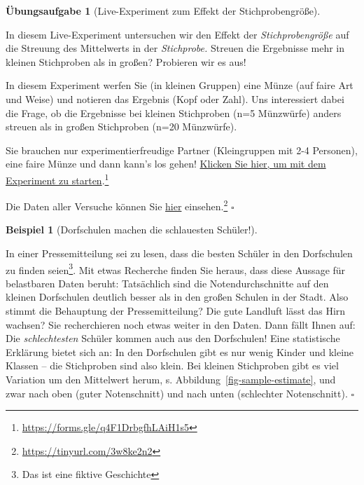 \documentclass[
  a4paper,
  DIV=11]{scrreprt}
\theoremstyle{definition}
\newtheorem{exercise}{Übungsaufgabe}[chapter]
\theoremstyle{definition}
\newtheorem{example}{Beispiel}[chapter]
\theoremstyle{definition}
\theoremstyle{remark}
\begin{document}
\begin{exercise}[Live-Experiment zum Effekt der
Stichprobengröße]\protect\hypertarget{exr-kleine-grosse-stipro}{}\label{exr-kleine-grosse-stipro}

In diesem Live-Experiment untersuchen wir den Effekt der
\emph{Stichprobengröße} auf die Streuung des Mittelwerts in der
\emph{Stichprobe.} Streuen die Ergebnisse mehr in kleinen Stichproben
als in großen? Probieren wir es aus!

In diesem Experiment werfen Sie (in kleinen Gruppen) eine Münze (auf
faire Art und Weise) und notieren das Ergebnis (Kopf oder Zahl). Uns
interessiert dabei die Frage, ob die Ergebnisse bei kleinen Stichproben
(n=5 Münzwürfe) anders streuen als in großen Stichproben (n=20
Münzwürfe).

Sie brauchen nur experimentierfreudige Partner (Kleingruppen mit 2-4
Personen), eine faire Münze und dann kann's los gehen!
\href{https://docs.google.com/forms/d/e/1FAIpQLSeAwqNyZtyQwttq5JrQdQ2AO7w5vzcVDXjiejKnyFNxiWtEag/viewform?usp=sf_link}{Klicken
Sie hier, um mit dem Experiment zu starten}.\footnote{\url{https://forms.gle/q4F1DrbgfhLAiH1s5}}

Die Daten aller Versuche können Sie
\href{https://docs.google.com/spreadsheets/d/11mKFFpr-Y1CMPpq4dGA-JA_Z9jRkPbXolo54Y0G_2gE/edit?usp=sharing}{hier}
einsehen.\footnote{\url{https://tinyurl.com/3w8ke2n2}} \(\square\)

\end{exercise}

\begin{example}[Dorfschulen machen die schlauesten
Schüler!]\protect\hypertarget{exm-schule-samplesize}{}\label{exm-schule-samplesize}

In einer Pressemitteilung sei zu lesen, dass die besten Schüler in den
Dorfschulen zu finden seien\footnote{Das ist eine fiktive Geschichte}.
Mit etwas Recherche finden Sie heraus, dass diese Aussage für
belastbaren Daten beruht: Tatsächlich sind die Notendurchschnitte auf
den kleinen Dorfschulen deutlich besser als in den großen Schulen in der
Stadt. Also stimmt die Behauptung der Pressemitteilung? Die gute
Landluft lässt das Hirn wachsen? Sie recherchieren noch etwas weiter in
den Daten. Dann fällt Ihnen auf: Die \emph{schlechtesten} Schüler kommen
auch aus den Dorfschulen! Eine statistische Erklärung bietet sich an: In
den Dorfschulen gibt es nur wenig Kinder und kleine Klassen -- die
Stichproben sind also klein. Bei kleinen Stichproben gibt es viel
Variation um den Mittelwert herum, s.
Abbildung~\ref{fig-sample-estimate}, und zwar nach oben (guter
Notenschnitt) und nach unten (schlechter Notenschnitt). \(\square\)

\end{example}
\end{document}
